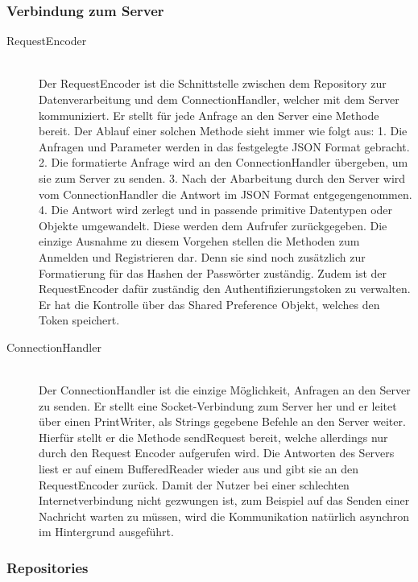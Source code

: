 \documentclass[parskip=full,11pt]{scrartcl}
\begin{document}
\subsubsection{Verbindung zum Server}
\begin{description}
\item[RequestEncoder]\hfill \\
Der RequestEncoder ist die Schnittstelle zwischen dem Repository zur Datenverarbeitung
und dem ConnectionHandler, welcher mit dem Server kommuniziert. Er stellt für jede Anfrage an den
Server eine Methode bereit. Der Ablauf einer solchen Methode sieht immer wie folgt aus:
1. Die Anfragen und Parameter werden in das festgelegte JSON Format gebracht.
2. Die formatierte Anfrage wird an den ConnectionHandler übergeben, um sie zum Server zu senden.
3. Nach der Abarbeitung durch den Server wird vom ConnectionHandler die Antwort im JSON
Format entgegengenommen.
4. Die Antwort wird zerlegt und in passende primitive Datentypen oder Objekte umgewandelt.
Diese werden dem Aufrufer zurückgegeben.
Die einzige Ausnahme zu diesem Vorgehen stellen die Methoden zum Anmelden und
Registrieren dar. Denn sie sind noch zusätzlich zur Formatierung für das Hashen
der Passwörter zuständig.
Zudem ist der RequestEncoder dafür zuständig den Authentifizierungstoken zu verwalten.
Er hat die Kontrolle über das Shared Preference Objekt, welches den Token speichert.
\item[ConnectionHandler]\hfill \\
Der ConnectionHandler ist die einzige Möglichkeit, Anfragen an den Server zu
senden. Er stellt eine Socket-Verbindung zum Server her und er leitet über
einen PrintWriter, als Strings gegebene Befehle an den Server weiter. Hierfür
stellt er die Methode sendRequest bereit, welche allerdings nur durch den
Request Encoder aufgerufen wird. Die Antworten des Servers liest er auf
einem BufferedReader wieder aus und gibt sie an den RequestEncoder zurück.
Damit der Nutzer bei einer schlechten Internetverbindung nicht gezwungen ist,
zum Beispiel auf das Senden einer Nachricht warten zu müssen, wird die Kommunikation
natürlich asynchron im Hintergrund ausgeführt.
\end{description}

\subsubsection{Repositories}
\end{document}

